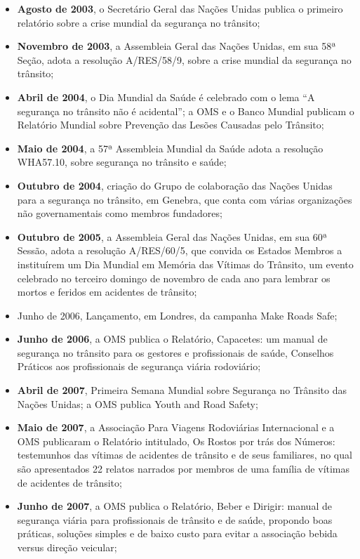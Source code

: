 \begin{itemize}
\item \textbf{Agosto de 2003}, o Secretário Geral das Nações Unidas publica o primeiro relatório sobre a crise mundial da segurança no trânsito;
\item \textbf{Novembro de 2003}, a Assembleia Geral das Nações Unidas, em sua 58ª Seção, adota a resolução A/RES/58/9, sobre a crise mundial da segurança no trânsito;
\item \textbf{Abril de 2004}, o Dia Mundial da Saúde é celebrado com o lema “A segurança no trânsito não é acidental”; a OMS e o Banco Mundial publicam o Relatório Mundial sobre Prevenção das Lesões Causadas pelo Trânsito;
\item \textbf{Maio de 2004}, a 57ª Assembleia Mundial da Saúde adota a resolução WHA57.10, sobre segurança no trânsito e saúde;
\item \textbf{Outubro de 2004}, criação do Grupo de colaboração das Nações Unidas para a segurança no trânsito, em Genebra, que conta com várias organizações não governamentais como membros fundadores;
\item \textbf{Outubro de 2005}, a Assembleia Geral das Nações Unidas, em sua 60ª Sessão, adota a resolução A/RES/60/5, que convida os Estados Membros a instituírem um Dia Mundial em Memória das Vítimas do Trânsito, um evento celebrado no terceiro domingo de novembro de cada ano para lembrar os mortos e feridos em acidentes de trânsito;
\item Junho de 2006, Lançamento, em Londres, da campanha Make Roads Safe;
\item \textbf{Junho de 2006}, a OMS publica o Relatório, Capacetes: um manual de segurança no trânsito para os gestores e profissionais de saúde, Conselhos Práticos aos profissionais de segurança viária rodoviário;
\item \textbf{Abril de 2007}, Primeira Semana Mundial sobre Segurança no Trânsito das Nações Unidas; a OMS publica Youth and Road Safety;
\item \textbf{Maio de 2007}, a Associação Para Viagens Rodoviárias Internacional e a OMS publicaram o Relatório intitulado, Os Rostos por trás dos Números: testemunhos das vítimas de acidentes de trânsito e de seus familiares, no qual são apresentados 22 relatos narrados por membros de uma família de vítimas de acidentes de trânsito;
\item \textbf{Junho de 2007}, a OMS publica o Relatório, Beber e Dirigir: manual de segurança viária para profissionais de trânsito e de saúde, propondo boas práticas, soluções simples e de baixo custo para evitar a associação bebida versus direção veicular;

\end{itemize}
